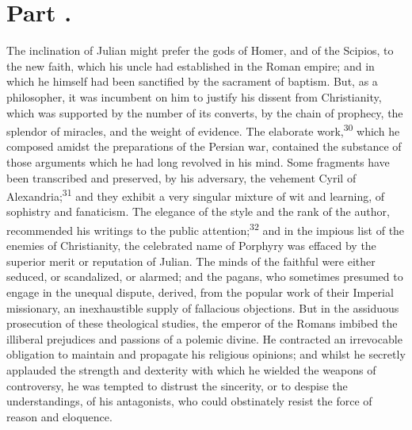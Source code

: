 


\section{Part \thesection.}

The inclination of Julian might prefer the gods of Homer, and of
the Scipios, to the new faith, which his uncle had established in
the Roman empire; and in which he himself had been sanctified by
the sacrament of baptism. But, as a philosopher, it was incumbent
on him to justify his dissent from Christianity, which was
supported by the number of its converts, by the chain of
prophecy, the splendor of miracles, and the weight of evidence.
The elaborate work,\textsuperscript{30} which he composed amidst the preparations
of the Persian war, contained the substance of those arguments
which he had long revolved in his mind. Some fragments have been
transcribed and preserved, by his adversary, the vehement Cyril
of Alexandria;\textsuperscript{31} and they exhibit a very singular mixture of wit
and learning, of sophistry and fanaticism. The elegance of the
style and the rank of the author, recommended his writings to the
public attention;\textsuperscript{32} and in the impious list of the enemies of
Christianity, the celebrated name of Porphyry was effaced by the
superior merit or reputation of Julian. The minds of the faithful
were either seduced, or scandalized, or alarmed; and the pagans,
who sometimes presumed to engage in the unequal dispute, derived,
from the popular work of their Imperial missionary, an
inexhaustible supply of fallacious objections. But in the
assiduous prosecution of these theological studies, the emperor
of the Romans imbibed the illiberal prejudices and passions of a
polemic divine. He contracted an irrevocable obligation to
maintain and propagate his religious opinions; and whilst he
secretly applauded the strength and dexterity with which he
wielded the weapons of controversy, he was tempted to distrust
the sincerity, or to despise the understandings, of his
antagonists, who could obstinately resist the force of reason and
eloquence.

